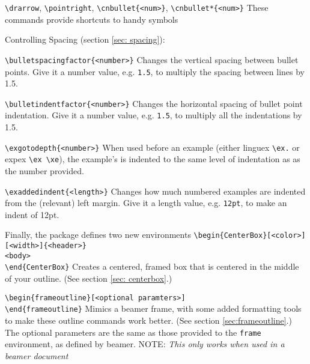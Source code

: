 \documentclass[11pt]{article}
\begin{document}
	\2 {\color{blue}\verb+\drarrow+}, {\color{blue}\verb+\pointright+}, {\color{blue}\verb+\cnbullet{<num>}+}, {\color{blue}\verb+\cnbullet*{<num>}+}
		\3 These commands provide shortcuts to handy symbols

\1 Controlling Spacing (section \ref{sec: spacing}):

	\2 {\color{blue}\verb+\bulletspacingfactor{<number>}+}
		\3 Changes the vertical spacing between bullet points. Give it a number value, e.g. \verb+1.5+, to multiply the spacing between lines by 1.5.

	\2 {\color{blue}\verb+\bulletindentfactor{<number>}+}
		\3 Changes the horizontal spacing of bullet point indentation. Give it a number value, e.g. \verb+1.5+, to multiply all the indentations by 1.5.


	\2 {\color{blue}\verb+\exgotodepth{<number>}+}
		\3 When used before an example (either linguex \verb+\ex.+ or expex \verb+\ex \xe+), the example's is indented to the same level of indentation as as the number provided.
		
	\2 {\color{blue}\verb+\exaddedindent{<length>}+}
		\3 Changes how much numbered examples are indented from the (relevant) left margin. Give it a length value, e.g. \verb+12pt+, to make an indent of 12pt.

\1 Finally, the package defines two new environments
	\2 {\color{blue}\verb+\begin{CenterBox}[<color>][<width>]{<header>}+\\\verb+<body>+\\\verb+\end{CenterBox}+}
		\3 Creates a centered, framed box that is centered in the middle of your outline. (See section \ref{sec: centerbox}.)

	\2 {\color{blue}\verb+\begin{frameoutline}[<optional paramters>]+\\\verb+\end{frameoutline}+}
		\3 Mimics a beamer frame, with some added formatting tools to make these outline commands work better. (See section \ref{sec:frameoutline}.) The optional parameters are the same as those provided to the \verb+frame+ environment, as defined by beamer.
		\3 NOTE: \textit{This only works when used in a beamer document}
	
\end{document}
